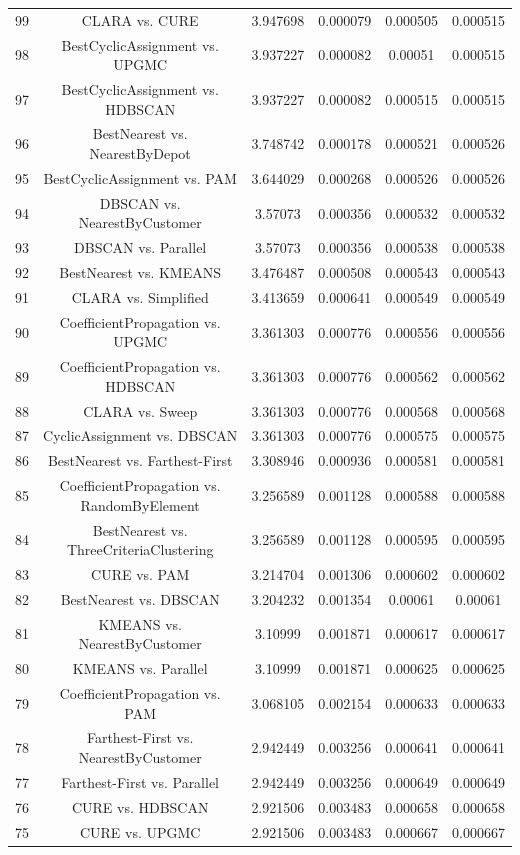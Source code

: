 \documentclass[a4paper,10pt]{article}
\begin{document}
\begin{landscape}
\begin{table}[!htp]
\begin{tabular}{cccccc}
99&CLARA vs. CURE&3.947698&0.000079&0.000505&0.000515\\
98&BestCyclicAssignment vs. UPGMC&3.937227&0.000082&0.00051&0.000515\\
97&BestCyclicAssignment vs. HDBSCAN&3.937227&0.000082&0.000515&0.000515\\
96&BestNearest vs. NearestByDepot&3.748742&0.000178&0.000521&0.000526\\
95&BestCyclicAssignment vs. PAM&3.644029&0.000268&0.000526&0.000526\\
94&DBSCAN vs. NearestByCustomer&3.57073&0.000356&0.000532&0.000532\\
93&DBSCAN vs. Parallel&3.57073&0.000356&0.000538&0.000538\\
92&BestNearest vs. KMEANS&3.476487&0.000508&0.000543&0.000543\\
91&CLARA vs. Simplified&3.413659&0.000641&0.000549&0.000549\\
90&CoefficientPropagation vs. UPGMC&3.361303&0.000776&0.000556&0.000556\\
89&CoefficientPropagation vs. HDBSCAN&3.361303&0.000776&0.000562&0.000562\\
88&CLARA vs. Sweep&3.361303&0.000776&0.000568&0.000568\\
87&CyclicAssignment vs. DBSCAN&3.361303&0.000776&0.000575&0.000575\\
86&BestNearest vs. Farthest-First&3.308946&0.000936&0.000581&0.000581\\
85&CoefficientPropagation vs. RandomByElement&3.256589&0.001128&0.000588&0.000588\\
84&BestNearest vs. ThreeCriteriaClustering&3.256589&0.001128&0.000595&0.000595\\
83&CURE vs. PAM&3.214704&0.001306&0.000602&0.000602\\
82&BestNearest vs. DBSCAN&3.204232&0.001354&0.00061&0.00061\\
81&KMEANS vs. NearestByCustomer&3.10999&0.001871&0.000617&0.000617\\
80&KMEANS vs. Parallel&3.10999&0.001871&0.000625&0.000625\\
79&CoefficientPropagation vs. PAM&3.068105&0.002154&0.000633&0.000633\\
78&Farthest-First vs. NearestByCustomer&2.942449&0.003256&0.000641&0.000641\\
77&Farthest-First vs. Parallel&2.942449&0.003256&0.000649&0.000649\\
76&CURE vs. HDBSCAN&2.921506&0.003483&0.000658&0.000658\\
75&CURE vs. UPGMC&2.921506&0.003483&0.000667&0.000667\\

\end{tabular}
\end{table}
\end{landscape}
\end{document}
